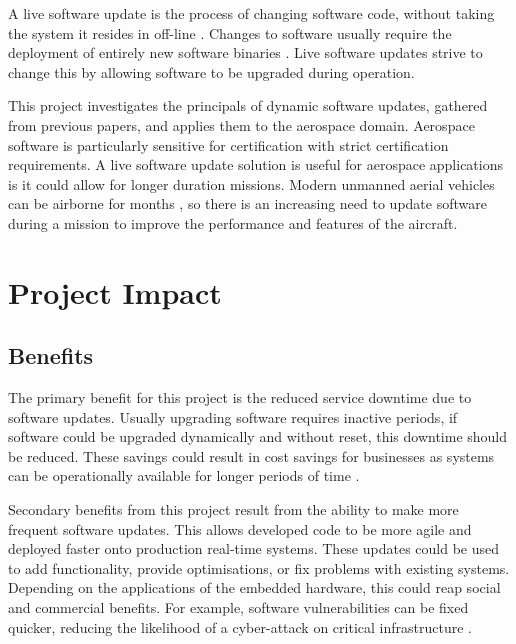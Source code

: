 
A live software update is the process of changing software code, without taking the system it resides in off-line \autocite{montgomeryModelUpdatingRealTime2004}. Changes to software usually require the deployment of entirely new software binaries \autocite{wahlerDisruptionfreeSoftwareUpdates2014}. Live software updates strive to change this by allowing software to be upgraded during operation.

This project investigates the principals of dynamic software updates, gathered from previous papers, and applies them to the aerospace domain. Aerospace software is particularly sensitive for certification with strict certification requirements. A live software update solution is useful for aerospace applications is it could allow for longer duration missions. Modern unmanned aerial vehicles can be airborne for months \autocite{baesystemsPHASA352023}, so there is an increasing need to update software during a mission to improve the performance and features of the aircraft.

\newpage

\section{Project Impact}

\subsection{Benefits}

The primary benefit for this project is the reduced service downtime due to software updates.
Usually upgrading software requires inactive periods, if software could be upgraded dynamically and without reset, this downtime should be reduced. These savings could result in cost savings for businesses as systems can be operationally available for longer periods of time \autocite{seifzadehSurveyDynamicSoftware2013}.

Secondary benefits from this project result from the ability to make more frequent software updates. This allows developed code to be more agile and deployed faster onto production real-time systems. These updates could be used to add functionality, provide optimisations, or fix problems with existing systems. Depending on the applications of the embedded hardware, this could reap social and commercial benefits. For example, software vulnerabilities can be fixed quicker, reducing the likelihood of a cyber-attack on critical infrastructure \autocite{wallaLiveUpdatingUnikernels2017}.

